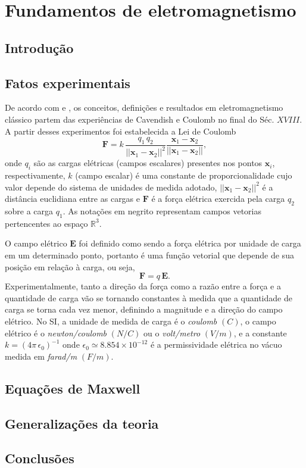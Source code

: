 \chapter{Fundamentos de eletromagnetismo}\label{sec.fund_eletr}

\section{Introdução}

\section{Fatos experimentais}
De acordo com \cite{jackson_classical_1999} e \cite{sommerfeld_52} , os conceitos, definições e resultados em eletromagnetismo clássico partem das experiências de Cavendish e Coulomb no final do Séc. $XVIII$. A partir desses experimentos foi estabelecida a Lei de Coulomb
\begin{equation}
\textbf{F}=k\,\frac{q_1\,q_2}{||\textbf{x}_1-\textbf{x}_2||^2}\frac{\textbf{x}_1-\textbf{x}_2}{||\textbf{x}_1-\textbf{x}_2||},
\end{equation}
onde $q_i$ são as cargas elétricas (campos escalares) presentes nos pontos $\textbf{x}_i$, respectivamente, $k$ (campo escalar) é uma constante de proporcionalidade cujo valor depende do sistema de unidades de medida adotado, $||\textbf{x}_1-\textbf{x}_2||^2$ é a distância euclidiana entre as cargas e $\textbf{F}$ é a força elétrica exercida pela carga $q_2$ sobre a carga $q_1$. As notações em negrito representam campos vetorias pertencentes ao espaço $\mathbb{R}^3$.

O campo elétrico $\textbf{E}$ foi definido como sendo a força elétrica por unidade de carga em um determinado ponto, portanto é uma função vetorial que depende de sua posição em relação à carga, ou seja,
\begin{equation}
\textbf{F}=q\,\textbf{E}.
\end{equation}
Experimentalmente, tanto a direção da força como a razão entre a força e a quantidade de carga vão se tornando constantes à medida que a quantidade de carga se torna cada vez menor, definindo a magnitude e a direção do campo elétrico. No SI, a unidade de medida de carga é o \textit{coulomb} $(C)$, o campo elétrico é o \textit{newton/coulomb} $(N/C)$ ou o \textit{volt/metro} $(V/m)$, e a constante $k=(4\pi\,\epsilon_0)^{-1}$ onde $\epsilon_0\simeq8.854\times10^{-12}$ é a permissividade elétrica no vácuo medida em \textit{farad/m} $(F/m)$. 

\section{Equações de Maxwell}

\section{Generalizações da teoria}

\section{Conclusões}